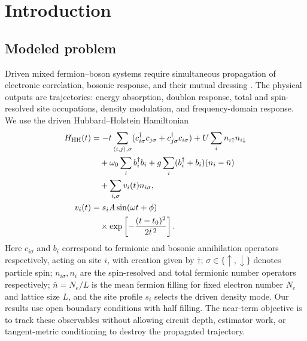 \documentclass[
  reprint,
  amsmath,
  amssymb,
  aps,
  pra,
  nofootinbib,
  superscriptaddress,
  floatfix
]{revtex4-2}
\begin{document}
\section{Introduction}

\subsection{Modeled problem}
Driven mixed fermion--boson systems require simultaneous propagation of electronic correlation, bosonic response, and their mutual dressing \cite{Macridin2018,Macridin2018PRA,Sawaya2020,Li2023,Denner2023}.  The physical outputs are trajectories: energy absorption, doublon response, total and spin-resolved site occupations, density modulation, and frequency-domain response.  We use the driven Hubbard--Holstein Hamiltonian
\begin{align}
H_{\rm HH}(t)
&=-t\sum_{\langle i,j\rangle,\sigma}
(c_{i\sigma}^{\dagger}c_{j\sigma}+c_{j\sigma}^{\dagger}c_{i\sigma})
+U\sum_i n_{i\uparrow}n_{i\downarrow}
\nonumber\\
&\quad+\omega_0\sum_i b_i^\dagger b_i
+g\sum_i(b_i^\dagger+b_i)(n_i-\bar n)
\nonumber\\
&\quad+\sum_{i,\sigma}v_i(t)n_{i\sigma},
\nonumber\\
v_i(t)
&=s_i A\sin(\omega t+\phi)
\nonumber\\
&\quad\times
\exp\left[-\frac{(t-t_0)^2}{2\bar t^{\,2}}\right].
\label{eq:hubbard_holstein_driven}
\end{align}
Here \(c_{i\sigma}\) and \(b_i\) correspond to fermionic and bosonic annihilation operators respectively, acting on site $i$, with creation given by $\dagger$; $\sigma \in\{\uparrow, \downarrow\}$ denotes particle spin;
\(n_{i\sigma}, n_i\) are the spin-resolved and total fermionic number operators respectively; \(\bar n=N_e/L\) is the mean fermion filling
for fixed electron number \(N_e\) and lattice size \(L\), and the site profile \(s_i\) selects the driven density mode. Our results use open boundary conditions with half filling.  The near-term objective is to track these observables without allowing circuit depth, estimator work, or tangent-metric conditioning to destroy the propagated trajectory.
\end{document}
